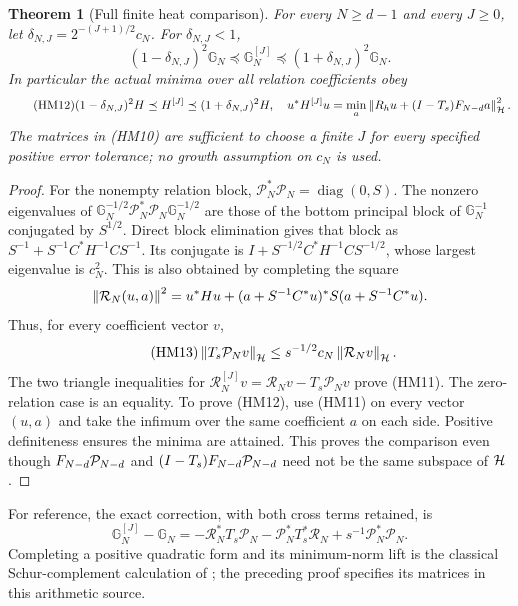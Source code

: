 \documentclass[11pt]{article}
\newtheorem{theorem}{Theorem}[section]
\begin{document}
\begin{theorem}[Full finite heat comparison]
For every $N\ge d-1$ and every $J\ge0$, let
$\delta_{N,J}=2^{-(J+1)/2}c_N$. For $\delta_{N,J}<1$,
\begin{equation}\tag{HM11}
 (1-\delta_{N,J})^2\mathbb G_N
 \preceq\mathbb G_N^{[J]}
 \preceq(1+\delta_{N,J})^2\mathbb G_N.
\end{equation}
In particular the actual minima over all relation coefficients obey
\begin{equation}\tag{HM12}
 (1-\delta_{N,J})^2H\preceq H^{[J]}
                 \preceq(1+\delta_{N,J})^2H,
 \quad
 u^*H^{[J]}u=\min_a\left\lVert R_hu+(I-T_s)F_{N-d}a\right\rVert_{\mathcal H}^2.
\end{equation}
The matrices in (HM10) are sufficient to choose a finite $J$ for every
specified positive error tolerance; no growth assumption on $c_N$ is used.
\end{theorem}
\begin{proof}
For the nonempty relation block,
$\mathcal P_N^*\mathcal P_N=\operatorname{diag}(0,S)$.
The nonzero eigenvalues of
$\mathbb G_N^{-1/2}\mathcal P_N^*\mathcal P_N\mathbb G_N^{-1/2}$
are those of the bottom principal block of $\mathbb G_N^{-1}$
conjugated by $S^{1/2}$. Direct block elimination gives that block as
$S^{-1}+S^{-1}C^*H^{-1}CS^{-1}$. Its conjugate is
$I+S^{-1/2}C^*H^{-1}CS^{-1/2}$, whose largest eigenvalue is $c_N^2$.
This is also obtained by completing the square
\[
 \left\lVert\mathcal R_N(u,a)\right\rVert^2
 =u^*Hu+(a+S^{-1}C^*u)^*S(a+S^{-1}C^*u).
\]
Thus, for every coefficient vector $v$,
\begin{equation}\tag{HM13}
 \left\lVert T_s\mathcal P_Nv\right\rVert_{\mathcal H}
 \le s^{-1/2}c_N\left\lVert\mathcal R_Nv\right\rVert_{\mathcal H}.
\end{equation}
The two triangle inequalities for
$\mathcal R_N^{[J]}v=\mathcal R_Nv-T_s\mathcal P_Nv$
prove (HM11). The zero-relation case is an equality.
To prove (HM12), use (HM11) on every vector $(u,a)$ and take the
infimum over the same coefficient $a$ on each side. Positive definiteness
ensures the minima are attained. This proves the comparison even though
$F_{N-d}\mathcal P_{N-d}$ and $(I-T_s)F_{N-d}\mathcal P_{N-d}$ need not be the
same subspace of $\mathcal H$.
\end{proof}
For reference, the exact correction, with both cross terms retained, is
\begin{equation}\tag{HM14}
 \mathbb G_N^{[J]}-\mathbb G_N
 =-\mathcal R_N^*T_s\mathcal P_N
  -\mathcal P_N^*T_s^*\mathcal R_N+s^{-1}\mathcal P_N^*\mathcal P_N.
\end{equation}
Completing a positive quadratic form and its minimum-norm lift is the
classical Schur-complement calculation of \cite[Appendix C.4.1]{hm2:Boyd};
the preceding proof specifies its matrices in this arithmetic source.
\end{document}
